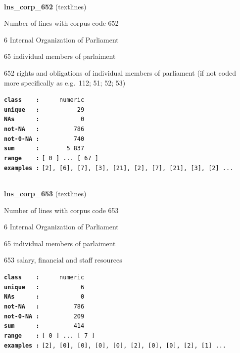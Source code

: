 \documentclass[]{article}
\begin{document}
~

\textbf{lns\_corp\_652} (textlines)

Number of lines with corpus code 652

6 Internal Organization of Parliament

65 individual members of parlaiment

652 rights and obligations of individual members of parliament (if not
coded more specifically as e.g.~112; 51; 52; 53)

\textbf{\texttt{class\ \ \ \ :}} \texttt{~~~~~numeric}\\
\textbf{\texttt{unique\ \ \ :}} \texttt{~~~~~~~~~~29}\\
\textbf{\texttt{NAs\ \ \ \ \ \ :}} \texttt{~~~~~~~~~~~0}\\
\textbf{\texttt{not-NA\ \ \ :}} \texttt{~~~~~~~~~786}\\
\textbf{\texttt{not-0-NA\ :}} \texttt{~~~~~~~~~740}\\
\textbf{\texttt{sum\ \ \ \ \ \ :}} \texttt{~~~~~~~5~837}\\
\textbf{\texttt{range\ \ \ \ :}}
\texttt{{[}\ 0\ {]}\ ...\ {[}\ 67\ {]}}\\
\textbf{\texttt{examples\ :}}
\texttt{{[}2{]},\ {[}6{]},\ {[}7{]},\ {[}3{]},\ {[}21{]},\ {[}2{]},\ {[}7{]},\ {[}21{]},\ {[}3{]},\ {[}2{]}\ ...}\\

~

\textbf{lns\_corp\_653} (textlines)

Number of lines with corpus code 653

6 Internal Organization of Parliament

65 individual members of parlaiment

653 salary, financial and staff resources

\textbf{\texttt{class\ \ \ \ :}} \texttt{~~~~~numeric}\\
\textbf{\texttt{unique\ \ \ :}} \texttt{~~~~~~~~~~~6}\\
\textbf{\texttt{NAs\ \ \ \ \ \ :}} \texttt{~~~~~~~~~~~0}\\
\textbf{\texttt{not-NA\ \ \ :}} \texttt{~~~~~~~~~786}\\
\textbf{\texttt{not-0-NA\ :}} \texttt{~~~~~~~~~209}\\
\textbf{\texttt{sum\ \ \ \ \ \ :}} \texttt{~~~~~~~~~414}\\
\textbf{\texttt{range\ \ \ \ :}}
\texttt{{[}\ 0\ {]}\ ...\ {[}\ 7\ {]}}\\
\textbf{\texttt{examples\ :}}
\texttt{{[}2{]},\ {[}0{]},\ {[}0{]},\ {[}0{]},\ {[}0{]},\ {[}2{]},\ {[}0{]},\ {[}0{]},\ {[}2{]},\ {[}1{]}\ ...}\\
\end{document}
